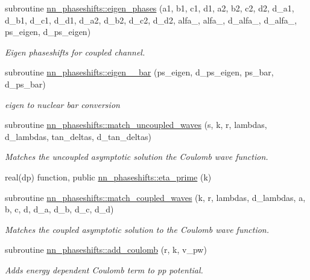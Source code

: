 \begin{DoxyCompactItemize}
subroutine \hyperlink{namespacenn__phaseshifts_aaf6bc866ac6041ef0c637dab1102128d}{nn\+\_\+phaseshifts\+::eigen\+\_\+phases} (a1, b1, c1, d1, a2, b2, c2, d2, d\+\_\+a1, d\+\_\+b1, d\+\_\+c1, d\+\_\+d1, d\+\_\+a2, d\+\_\+b2, d\+\_\+c2, d\+\_\+d2, alfa\+\_, alfa\+\_, d\+\_\+alfa\+\_, d\+\_\+alfa\+\_, ps\+\_\+eigen, d\+\_\+ps\+\_\+eigen)
\begin{DoxyCompactList}\small\item\em Eigen phaseshifts for coupled channel. \end{DoxyCompactList}\item 
subroutine \hyperlink{namespacenn__phaseshifts_a15db9c0b3bd3b67547327fb5935a8e08}{nn\+\_\+phaseshifts\+::eigen\+\_\+\_\+bar} (ps\+\_\+eigen, d\+\_\+ps\+\_\+eigen, ps\+\_\+bar, d\+\_\+ps\+\_\+bar)
\begin{DoxyCompactList}\small\item\em eigen to nuclear bar conversion \end{DoxyCompactList}\item 
subroutine \hyperlink{namespacenn__phaseshifts_a1604cc5651f2d6761cb82b494ec40e23}{nn\+\_\+phaseshifts\+::match\+\_\+uncoupled\+\_\+waves} (s, k, r, lambdas, d\+\_\+lambdas, tan\+\_\+deltas, d\+\_\+tan\+\_\+deltas)
\begin{DoxyCompactList}\small\item\em Matches the uncoupled asymptotic solution the Coulomb wave function. \end{DoxyCompactList}\item 
real(dp) function, public \hyperlink{namespacenn__phaseshifts_af570a5386b15b626b75fe46125ae0abe}{nn\+\_\+phaseshifts\+::eta\+\_\+prime} (k)
\item 
subroutine \hyperlink{namespacenn__phaseshifts_a06ad5d92bcc80ec0ffd8320854595af6}{nn\+\_\+phaseshifts\+::match\+\_\+coupled\+\_\+waves} (k, r, lambdas, d\+\_\+lambdas, a, b, c, d, d\+\_\+a, d\+\_\+b, d\+\_\+c, d\+\_\+d)
\begin{DoxyCompactList}\small\item\em Matches the coupled asymptotic solution to the Coulomb wave function. \end{DoxyCompactList}\item 
subroutine \hyperlink{namespacenn__phaseshifts_a4cd6862b1d9183019dfabf2b8a2f1e98}{nn\+\_\+phaseshifts\+::add\+\_\+coulomb} (r, k, v\+\_\+pw)
\begin{DoxyCompactList}\small\item\em Adds energy dependent Coulomb term to pp potential. \end{DoxyCompactList}\end{DoxyCompactItemize}
